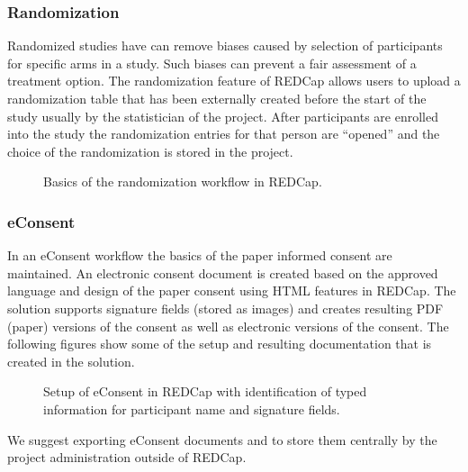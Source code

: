 \documentclass[letterpaper,10pt,english]{sphinxmanual}
\begin{document}
\subsubsection{Randomization}
\label{\detokenize{EndUser/index:randomization}}
\sphinxAtStartPar
Randomized studies have can remove biases caused by selection of participants for specific arms in a study. Such biases can prevent a fair assessment of a treatment option. The randomization feature of REDCap allows users to upload a randomization table that has been externally created before the start of the study \textendash{} usually by the statistician of the project. After participants are enrolled into the study the randomization entries for that person are “opened” and the choice of the randomization is stored in the project.

\begin{figure}[htbp]
\centering
\capstart

\noindent{}
\caption{Basics of the randomization workflow in REDCap.}\label{\detokenize{EndUser/index:id4}}\end{figure}


\subsubsection{e\sphinxhyphen{}Consent}
\label{\detokenize{EndUser/index:e-consent}}
\sphinxAtStartPar
In an e\sphinxhyphen{}Consent workflow the basics of the paper informed consent are maintained. An electronic consent document is created based on the approved language and design of the paper consent using HTML features in REDCap. The solution supports signature fields (stored as images) and creates resulting PDF (paper) versions of the consent as well as electronic versions of the consent. The following figures show some of the setup and resulting documentation that is created in the solution.

\begin{figure}[htbp]
\centering
\capstart

\noindent{}
\caption{Setup of e\sphinxhyphen{}Consent in REDCap with identification of typed information for participant name and signature fields.}\label{\detokenize{EndUser/index:id5}}\end{figure}

\sphinxAtStartPar
We suggest exporting e\sphinxhyphen{}Consent documents and to store them centrally by the project administration outside of REDCap.
\end{document}
